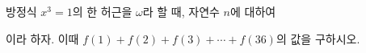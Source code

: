 방정식 $x^3=1$의 한 허근을 $\omega$라 할 때, 자연수 $n$에 대하여\par\smallskip{}\par\smallskip\noindent 이라 하자. 이때 $f(1)+f(2)+f(3)+\cdots+f(36)$의 값을 구하시오.
